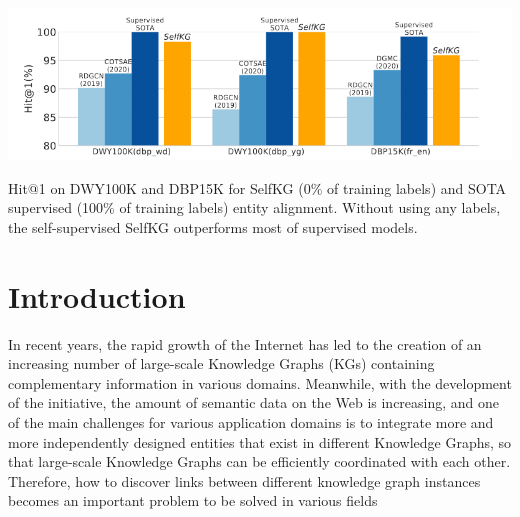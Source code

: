 \documentclass[sigconf]{acmart}
\begin{document}



\begin{teaserfigure}
  \includegraphics[width=\textwidth]{figure/hit@1.png}
  \caption{Hit@1 on DWY100K and DBP15K for SelfKG (0\% of training labels) and SOTA supervised (100\% of training labels) entity alignment. Without using any labels, the self-supervised SelfKG outperforms most of supervised models.}
  \Description{}
  \label{fig:teaser}
\end{teaserfigure}


\maketitle
\section{Introduction}

In recent years, the rapid growth of the Internet has led to the creation of an increasing number of large-scale Knowledge Graphs (KGs) \cite{hogan2021knowledge} containing complementary information in various domains. Meanwhile, with the development of the initiative, the amount of semantic data on the Web is increasing, and one of the main challenges for various application domains is to integrate more and more independently designed entities that exist in different Knowledge Graphs, so that large-scale Knowledge Graphs can be efficiently coordinated with each other. Therefore, how to discover links between different knowledge graph instances becomes an important problem to be solved in various fields
\end{document}
